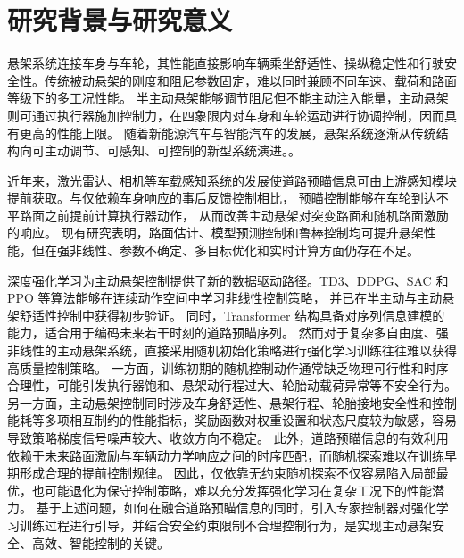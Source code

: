 \section{研究背景与研究意义}

悬架系统连接车身与车轮，其性能直接影响车辆乘坐舒适性、操纵稳定性和行驶安全性\cite{fekry2023vehicle,JXKF202502001}。传统被动悬架的刚度和阻尼参数固定，难以同时兼顾不同车速、载荷和路面等级下的多工况性能。
半主动悬架能够调节阻尼但不能主动注入能量，主动悬架则可通过执行器施加控制力，在四象限内对车身和车轮运动进行协调控制，因而具有更高的性能上限\cite{balamurugan2012investigation,2013Active}。
随着新能源汽车与智能汽车的发展，悬架系统逐渐从传统结构向可主动调节、可感知、可控制的新型系统演进。\cite{wang2025negstiffness,cheng2019savgs}。

近年来，激光雷达、相机等车载感知系统的发展使道路预瞄信息可由上游感知模块提前获取\cite{qin2019novel,ni2020roadprofile}。与仅依赖车身响应的事后反馈控制相比，
预瞄控制能够在车轮到达不平路面之前提前计算执行器动作，
从而改善主动悬架对突变路面和随机路面激励的响应\cite{pang2019preview,wu2020preview,papadimitrakis2022preview}。
现有研究表明，路面估计、模型预测控制和鲁棒控制均可提升悬架性能\cite{Tu2015adaptive,moradi2019offline,kim2023mpc}，但在强非线性、参数不确定、多目标优化和实时计算方面仍存在不足。

深度强化学习为主动悬架控制提供了新的数据驱动路径。TD3、DDPG、SAC 和 PPO 等算法能够在连续动作空间中学习非线性控制策略\cite{lillicrap2015continuous,fujimoto2018addressing,haarnoja2018soft,schulman2017proximal}，
并已在半主动与主动悬架舒适性控制中获得初步验证\cite{lee2023drl,wang2024deep,wang2024drlexp,han2022ppo}。
同时，Transformer 结构具备对序列信息建模的能力\cite{vaswani2017attention}，适合用于编码未来若干时刻的道路预瞄序列。
然而对于复杂多自由度、强非线性的主动悬架系统，直接采用随机初始化策略进行强化学习训练往往难以获得高质量控制策略。
一方面，训练初期的随机控制动作通常缺乏物理可行性和时序合理性，可能引发执行器饱和、悬架动行程过大、轮胎动载荷异常等不安全行为。
另一方面，主动悬架控制同时涉及车身舒适性、悬架行程、轮胎接地安全性和控制能耗等多项相互制约的性能指标，奖励函数对权重设置和状态尺度较为敏感，容易导致策略梯度信号噪声较大、收敛方向不稳定。
此外，道路预瞄信息的有效利用依赖于未来路面激励与车辆动力学响应之间的时序匹配，而随机探索难以在训练早期形成合理的提前控制规律。
因此，仅依靠无约束随机探索不仅容易陷入局部最优，也可能退化为保守控制策略，难以充分发挥强化学习在复杂工况下的性能潜力\cite{brunke2022safe,achiam2017constrained}。
基于上述问题，如何在融合道路预瞄信息的同时，引入专家控制器对强化学习训练过程进行引导，并结合安全约束限制不合理控制行为，是实现主动悬架安全、高效、智能控制的关键。

